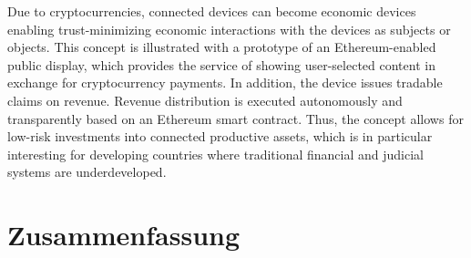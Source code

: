 Due to cryptocurrencies, connected devices can become economic devices enabling trust-minimizing economic interactions with the devices as subjects or objects. This concept is illustrated with a prototype of an Ethereum-enabled public display, which provides the service of showing user-selected content in exchange for cryptocurrency payments. In addition, the device issues tradable claims on revenue. Revenue distribution is executed autonomously and transparently based on an Ethereum smart contract. Thus, the concept allows for low-risk investments into connected productive assets, which is in particular interesting for developing countries where traditional financial and judicial systems are underdeveloped.





%
\vfill

\pagebreak


\chapter*{Zusammenfassung}

